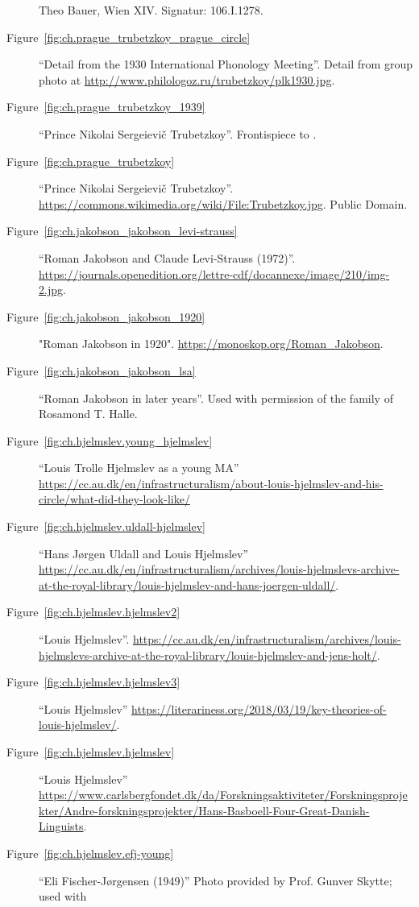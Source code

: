 \begin{description}
  Theo Bauer, Wien XIV. Signatur: 106.I.1278. 
\item[Figure~\ref{fig:ch.prague_trubetzkoy_prague_circle}] ``Detail
  from the 1930 International Phonology Meeting''. Detail from group
  photo at \url{http://www.philologoz.ru/trubetzkoy/plk1930.jpg}.
\item[Figure~\ref{fig:ch.prague_trubetzkoy_1939}] ``Prince Nikolai
  Sergeievič Trubetzkoy''. Frontispiece to
  \citealt{trubetzkoy39:grundzuge}.
\item[Figure~\ref{fig:ch.prague_trubetzkoy}] ``Prince Nikolai
  Sergeievič Trubetzkoy''.
  \url{https://commons.wikimedia.org/wiki/File:Trubetzkoy.jpg}. Public Domain.
\item[Figure~\ref{fig:ch.jakobson_jakobson_levi-strauss}] ``Roman
  Jakobson and Claude Levi-Strauss (1972)''. 
  \url{https://journals.openedition.org/lettre-cdf/docannexe/image/210/img-2.jpg}. 
\item[Figure~\ref{fig:ch.jakobson_jakobson_1920}]  "Roman Jakobson in
  1920".  \url{https://monoskop.org/Roman_Jakobson}.
\item[Figure~\ref{fig:ch.jakobson_jakobson_lsa}] ``Roman Jakobson in
later years''. Used with permission of the family of Rosamond
T. Halle.
\item[Figure~\ref{fig:ch.hjelmslev.young_hjelmslev}] ``Louis Trolle
  Hjelmslev as a young MA''
  \url{https://cc.au.dk/en/infrastructuralism/about-louis-hjelmslev-and-his-circle/what-did-they-look-like/}
\item[Figure~\ref{fig:ch.hjelmslev.uldall-hjelmslev}] ``Hans Jørgen
  Uldall and Louis Hjelmslev''
  \url{https://cc.au.dk/en/infrastructuralism/archives/louis-hjelmslevs-archive-at-the-royal-library/louis-hjelmslev-and-hans-joergen-uldall/}. 
\item[Figure~\ref{fig:ch.hjelmslev.hjelmslev2}] ``Louis
  Hjelmslev''. \url{https://cc.au.dk/en/infrastructuralism/archives/louis-hjelmslevs-archive-at-the-royal-library/louis-hjelmslev-and-jens-holt/}.
\item[Figure~\ref{fig:ch.hjelmslev.hjelmslev3}] ``Louis Hjelmslev''
  \url{https://literariness.org/2018/03/19/key-theories-of-louis-hjelmslev/}. 
\item[Figure~\ref{fig:ch.hjelmslev.hjelmslev}] ``Louis Hjelmslev''
  \url{https://www.carlsbergfondet.dk/da/Forskningsaktiviteter/Forskningsprojekter/Andre-forskningsprojekter/Hans-Basboell-Four-Great-Danish-Linguists}.
\item[Figure~\ref{fig:ch.hjelmslev.efj-young}] ``Eli Fischer-Jørgensen
  (1949)'' Photo provided by Prof. Gunver Skytte; used with

\end{description}
